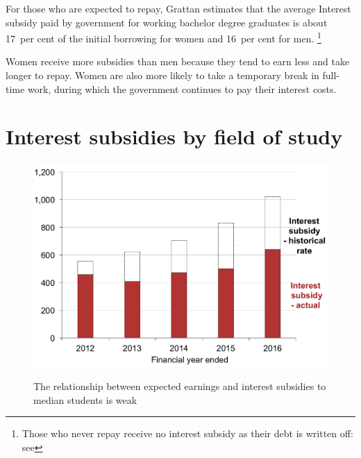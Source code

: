 \documentclass[embargoed]{grattan}
\begin{document}
For those who are expected to repay, Grattan estimates that the average \gls{Interest subsidy} paid by government for working bachelor degree graduates is about 17~per cent of the initial borrowing for women and 16~per cent for men.%
\footnote{Those who never repay receive no interest subsidy as their debt is written off: see }

Women receive more subsidies than men because they tend to earn less and take longer to repay.
Women are also more likely to take a temporary break in full-time work, during which the government continues to pay their interest costs.

\section{Interest subsidies by field of study}\label{interest-subsidies-by-field-of-study}

\begin{figure}
\caption{The relationship between expected earnings and interest subsidies to median students is weak}\label{fig:fig9-relationship-expected-earnings-interest-subsides-to-median-students-weak}

\includegraphics[page=9]{atlas/Chartpack.pdf}

%
{\textcites{DET2015FundingClusters}{ABS2012Censuspopulationhousing}}
\end{figure}
\end{document}
